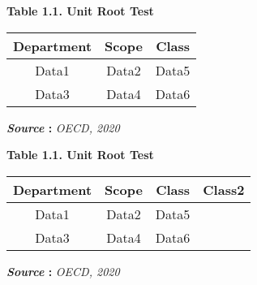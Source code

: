 \documentclass[10pt,a4paper]{article}
\begin{document}
\begin{center}
		\vspace{0.5cm}
		
		
		
		\textbf{Table 1.1. Unit Root Test} 
		
		\vspace{0.15cm}
		
		\begin{tabular}{|c|c|c|}
			\hline
			\textbf{Department} & \textbf{Scope} & \textbf{Class} \\ \cline{1-3}
			\hline
			Data1 & Data2 & Data5 \\ 
			\hline
			Data3 & Data4 & Data6 \\ \hline
		\end{tabular}	
		
		\vspace{0.15cm}	 
		
		\textbf{\textit{Source} :} \textit{OECD, 2020} 
		
		
		
		\textbf{Table 1.1. Unit Root Test} 
		
		\vspace{0.15cm}
		
		\begin{tabular}{|c|c|c|p{2cm}|}
			\hline
			\textbf{Department} & \textbf{Scope} & \textbf{Class} & \textbf{Class2} \\ \cline{1-4}
			\hline
			Data1 & Data2 & Data5 & \dotfill \\ 
			\hline
			Data3 & Data4 & Data6 & \dotfill \\ \hline
		\end{tabular}	
		
		\vspace{0.15cm}	
		
		\textbf{\textit{Source} :} \textit{OECD, 2020} 
		
		
		
		\begin{tabular}{|c|c|c|}
			

\end{tabular}
\end{center}
\end{document}
